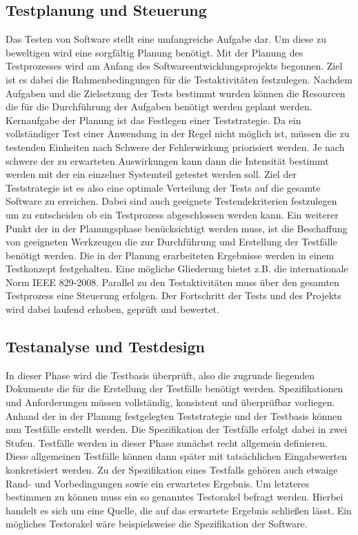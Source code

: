 \subsection{Testplanung und Steuerung}
\label{subsec:testplanung_und_steuerung}
Das Testen von Software stellt eine umfangreiche Aufgabe dar. Um diese zu beweltigen wird eine sorgfältig Planung benötigt.
Mit der Planung des Testprozesses wird am Anfang des Softwareentwicklungsprojekts begonnen.
Ziel ist es dabei die Rahmenbedingungen für die Testaktivitäten festzulegen.
Nachdem Aufgaben und die Zielsetzung der Tests bestimmt wurden können die Resourcen die für die Durchführung der Aufgaben benötigt werden geplant werden.
Kernaufgabe der Planung ist das Festlegen einer Teststrategie. Da ein vollständiger Test einer Anwendung in der Regel nicht möglich ist, müssen die zu testenden Einheiten nach Schwere der Fehlerwirkung priorisiert werden. Je nach schwere der zu erwarteten Auswirkungen kann dann die Intensität bestimmt werden mit der ein einzelner Systemteil getestet werden soll.
Ziel der Teststrategie ist es also eine optimale Verteilung der Tests auf die gesamte Software zu erreichen.
Dabei sind auch geeignete Testendekriterien festzulegen um zu entscheiden ob ein Testprozess abgeschlossen werden kann.
Ein weiterer Punkt der in der Planungsphase benücksichtigt werden muss, ist die Beschaffung von geeigneten Werkzeugen die zur Durchführung und Erstellung der Testfälle benötigt werden.
Die in der Planung erarbeiteten Ergebnisse werden in einem Testkonzept festgehalten.
Eine mögliche Gliederung bietet z.B. die internationale Norm IEEE 829-2008. \cite{ieee_ieee_2008}
Parallel zu den Testaktivitäten muss über den gesamten Testprozess eine Steuerung erfolgen.
Der Fortschritt der Tests und des Projekts wird dabei laufend erhoben, geprüft und bewertet.

\subsection{Testanalyse und Testdesign}
\label{subsec:testanalyse_und_design}
In dieser Phase wird die Testbasis überprüft, also die zugrunde liegenden Dokumente die für die Erstellung der Testfälle benötigt werden. Spezifikationen und Anforderungen müssen vollständig, konsistent und überprüfbar vorliegen.
Anhand der in der Planung festgelegten Teststrategie und der Testbasis können nun Testfälle erstellt werden.
Die Spezifikation der Testfälle erfolgt dabei in zwei Stufen. Testfälle werden in dieser Phase zunächst recht allgemein definieren. Diese allgemeinen Testfälle können dann später mit tatsächlichen Eingabewerten konkretisiert werden.
Zu der Spezifikation eines Testfalls gehören auch etwaige Rand- und Vorbedingungen sowie ein erwartetes Ergebnis. Um letzteres bestimmen zu können muss ein so genanntes Testorakel befragt werden. Hierbei handelt es sich um eine Quelle, die auf das erwartete Ergebnis schließen lässt. Ein mögliches Testorakel wäre beispielsweise die Spezifikation der Software.

